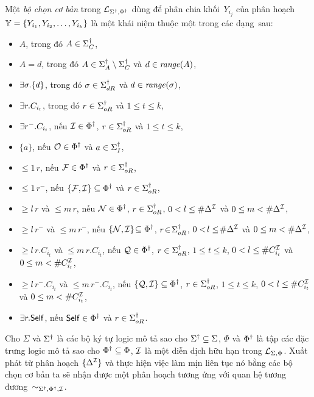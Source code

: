 \begin{Definition}
	\label{def:BasicSelectors}
	Một {\em bộ chọn cơ bản} trong $\mathcal{L}_{\Sigma^\dag,\Phi^\dag}$ dùng để phân chia khối~$Y_{i_j}$ của phân hoạch $\mathbb{Y} = \{Y_{i_1}, Y_{i_2}, \ldots, Y_{i_k}\}$ là một khái niệm thuộc một trong các dạng~sau:
	\begin{itemize}
		\item $A$, trong đó $A \in \Sigma^\dag_C$,
%		
		\item $A=d$, trong đó $A \in \Sigma^\dag_A\setminus\Sigma^\dag_C$ và $d \in \mathit{range}(A)$,
%		
		\item $\exists \sigma.\{d\}$, trong đó $\sigma \in \Sigma^\dag_{dR}$ và $d \in \mathit{range}(\sigma)$,
%
		\item $\exists r.C_{i_t}$, trong đó $r \in \Sigma^\dag_{oR}$ và $1 \leq t \leq k$,
%		
		\item $\exists r^-.C_{i_t}$, nếu $\mathcal{I} \in \Phi^\dag$, $r \in \Sigma^\dag_{oR}$ và $1 \leq t \leq k$,
%
		\item $\{a\}$, nếu $\mathcal{O} \in \Phi^\dag$ và $a \in \Sigma^\dag_I$,
%		
		\item $\leq\!1\,r$, nếu $\mathcal{F} \in \Phi^\dag$ và $r \in \Sigma^\dag_{oR}$,
%		
		\item $\leq\!1\,r^-$, nếu $\{\mathcal{F}, \mathcal{I}\} \subseteq \Phi^\dag$ và $r \in \Sigma^\dag_{oR}$,
%
		\item $\geq\!l\,r$ và $\leq\!m\,r$, nếu $\mathcal{N} \in \Phi^\dag$, $r \in \Sigma^\dag_{oR}$, $0 < l \leq \#\Delta^{\mathcal{I}}$ và $0 \leq m < \#\Delta^{\mathcal{I}}$,
%
		\item $\geq\!l\,r^-$ và $\leq\!m\,r^-$, nếu $\{\mathcal{N}, \mathcal{I}\}\!\subseteq \Phi^\dag$, $r\!\in\!\Sigma^\dag_{oR}$, $0 <\!l \leq\! \#\Delta^{\mathcal{I}}$ và $0 \leq m < \#\Delta^{\mathcal{I}}$,
%
		\item $\geq\!l\,r.C_{i_t}$ và $\leq\!m\,r.C_{i_t}$, nếu $\mathcal{Q} \in \Phi^\dag$, $r \in \Sigma^\dag_{oR}$, $1 \leq t \leq k$, $0 < l \leq \#C_{i_t}^{\mathcal{I}}$ và $0 \leq m < \#C_{i_t}^{\mathcal{I}}$,
%
		\item $\geq\!l\,r^-.C_{i_t}$ và $\leq\!m\,r^-.C_{i_t}$, nếu $\{\mathcal{Q}, \mathcal{I}\} \subseteq \Phi^\dag$, $r \in \Sigma^\dag_{oR}$, $1 \leq t \leq k$, $0 < l \leq \#C_{i_t}^{\mathcal{I}}$ và $0 \leq m < \#C_{i_t}^{\mathcal{I}}$,
%
		\item $\exists r.\mathsf{Self}$, nếu $\mathsf{Self} \in \Phi^\dag$ và $r \in \Sigma^\dag_{oR}$.\myend
	\end{itemize}
\end{Definition}

\begin{Theorem}
\label{th:BasicSelectors}
	Cho $\Sigma$ và $\Sigma^\dag$ là các bộ ký tự logic mô tả sao cho $\Sigma^\dag \subseteq \Sigma$, $\Phi$ và $\Phi^\dag$ là tập các đặc trưng logic mô tả sao cho $\Phi^\dag \subseteq \Phi$, $\mathcal{I}$ là một diễn dịch hữu hạn trong $\mathcal{L}_{\Sigma,\Phi}$.
	Xuất phát từ phân hoạch $\{\Delta^{\mathcal{I}}\}$ và thực hiện việc làm mịn liên tục nó bằng các bộ chọn cơ bản ta sẽ nhận được một phân hoạch tương ứng với quan hệ tương đương~$\sim_{\Sigma^\dag,\Phi^\dag,\mathcal{I}}$.
\end{Theorem}

